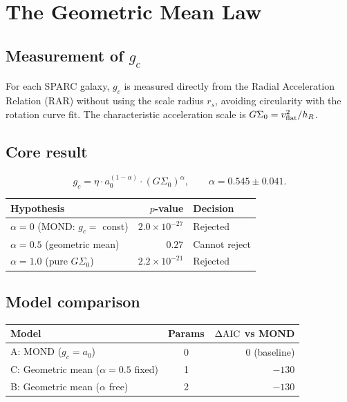 \documentclass[11pt,a4paper]{article}
\newcommand{\gc}{g_{c}}
\newcommand{\ao}{a_{0}}
\newcommand{\vflat}{v_{\rm flat}}
\newcommand{\hR}{h_{R}}
\newcommand{\AIC}{\Delta{\rm AIC}}
\begin{document}
\section{The Geometric Mean Law}

\subsection{Measurement of $\gc$}
For each SPARC galaxy, $\gc$ is measured directly from the Radial Acceleration Relation (RAR) without using
the scale radius $r_s$, avoiding circularity with the rotation curve fit. The characteristic acceleration
scale is $G\Sigma_0 = \vflat^2/\hR$.

\subsection{Core result}
\begin{equation}
\gc = \eta \cdot \ao^{(1-\alpha)} \cdot (G\Sigma_0)^{\alpha}, \qquad \alpha = 0.545 \pm 0.041.
\label{eq:geomean}
\end{equation}

\begin{center}\small
\begin{tabular}{@{}lrl@{}}
\toprule
Hypothesis & $p$-value & Decision \\
\midrule
$\alpha = 0$ (MOND: $\gc = $ const) & $2.0 \times 10^{-27}$ & Rejected \\
$\alpha = 0.5$ (geometric mean) & $0.27$ & Cannot reject \\
$\alpha = 1.0$ (pure $G\Sigma_0$) & $2.2 \times 10^{-21}$ & Rejected \\
\bottomrule
\end{tabular}
\end{center}

\subsection{Model comparison}
\begin{center}\small
\begin{tabular}{@{}lcr@{}}
\toprule
Model & Params & $\AIC$ vs MOND \\
\midrule
A: MOND ($\gc = \ao$) & 0 & 0 (baseline) \\
C: Geometric mean ($\alpha=0.5$ fixed) & 1 & $-130$ \\
B: Geometric mean ($\alpha$ free) & 2 & $-130$ \\
\bottomrule
\end{tabular}
\end{center}
\end{document}
